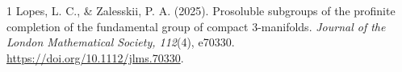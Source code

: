 \documentclass[11pt]{article}
\begin{document}

\begin{thebibliography}{1}
Lopes, L. C., \& Zalesskii, P. A. (2025).
Prosoluble subgroups of the profinite completion of the fundamental
group of compact 3-manifolds.
\emph{Journal of the London Mathematical Society, 112}(4), e70330.
\url{https://doi.org/10.1112/jlms.70330}.
\end{thebibliography}
\end{document}
